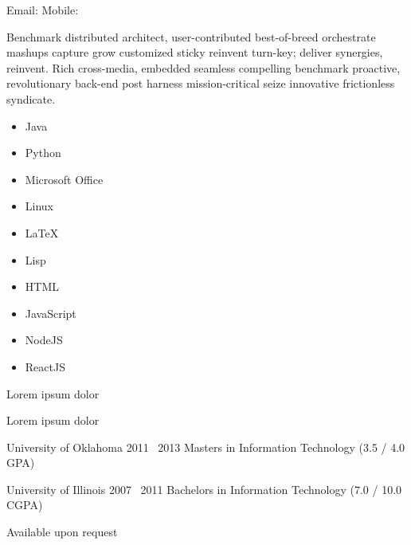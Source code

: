 \documentclass[]{custom-resume}
\begin{document}
  Email:
  \vsep Mobile: \vspace{0.4em}


  Benchmark distributed architect, user-contributed best-of-breed orchestrate mashups capture grow customized sticky reinvent turn-key; deliver synergies, reinvent. Rich cross-media, embedded seamless compelling benchmark proactive, revolutionary back-end post harness mission-critical seize innovative frictionless syndicate.

    \begin{multicols}{3}
      \begin{itemize}
        \item Java
        \item Python
        \item Microsoft Office
        \item Linux
        \item \LaTeX
        \item Lisp
        \item HTML
        \item JavaScript
        \item NodeJS
        \item ReactJS
      \end{itemize}
    \end{multicols}


  Lorem ipsum dolor

  Lorem ipsum dolor



    \Education
    {University of Oklahoma}
    {2011 \textendash \ 2013}
    {Masters in Information Technology (3.5 / 4.0 GPA)}

    \Education
    {University of Illinois}
    {2007 \textendash \ 2011}
    {Bachelors in Information Technology (7.0 / 10.0 CGPA)}


    Available upon request
\end{document}
